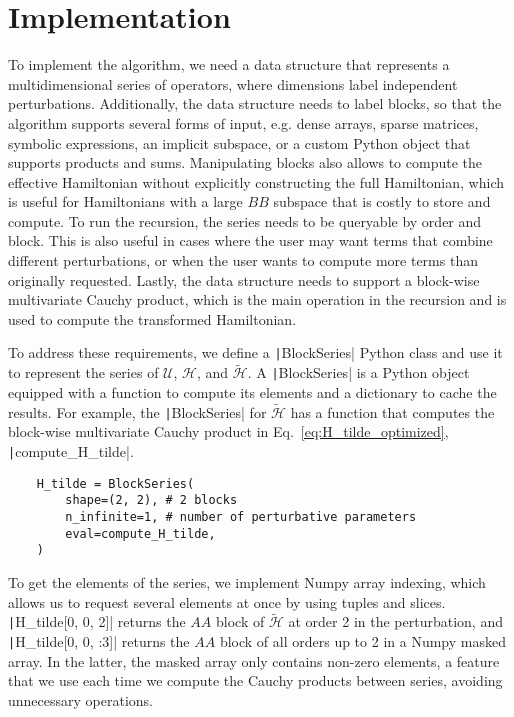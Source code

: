 \section{Implementation}

To implement the algorithm, we need a data structure that represents a
multidimensional series of operators, where dimensions label independent
perturbations.
Additionally, the data structure needs to label blocks, so that the algorithm
supports several forms of input, e.g. dense arrays, sparse matrices, symbolic
expressions, an implicit subspace, or a custom Python object that supports
products and sums.
Manipulating blocks also allows to compute the effective Hamiltonian without
explicitly constructing the full Hamiltonian, which is useful for Hamiltonians
with a large $BB$ subspace that is costly to store and compute.
To run the recursion, the series needs to be queryable by order and block.
This is also useful in cases where the user may want terms that combine
different perturbations, or when the user wants to compute more terms than
originally requested.
Lastly, the data structure needs to support a block-wise multivariate Cauchy
product, which is the main operation in the recursion and is used to compute
the transformed Hamiltonian.

To address these requirements, we define a \texttt|BlockSeries|
Python class and use it to represent the series of $\mathcal{U}$,
$\mathcal{H}$, and $\tilde{\mathcal{H}}$.
A \texttt|BlockSeries| is a Python object equipped with a function
to compute its elements and a dictionary to cache the results.
For example, the \texttt|BlockSeries| for $\tilde{\mathcal{H}}$ has
a function that computes the block-wise multivariate Cauchy product in
Eq.~\eqref{eq:H_tilde_optimized}, \texttt|compute_H_tilde|.
%
\begin{verbatim}
    H_tilde = BlockSeries(
        shape=(2, 2), # 2 blocks
        n_infinite=1, # number of perturbative parameters
        eval=compute_H_tilde,
    )
\end{verbatim}
%
To get the elements of the series, we implement Numpy array indexing,
which allows us to request several elements at once by using tuples and slices.
\texttt|H_tilde[0, 0, 2]| returns the $AA$ block of
$\tilde{\mathcal{H}}$ at order 2 in the perturbation, and
\texttt|H_tilde[0, 0, :3]| returns the $AA$ block of all orders up
to 2 in a Numpy masked array.
In the latter, the masked array only contains non-zero elements, a feature that
we use each time we compute the Cauchy products between series, avoiding
unnecessary operations.

